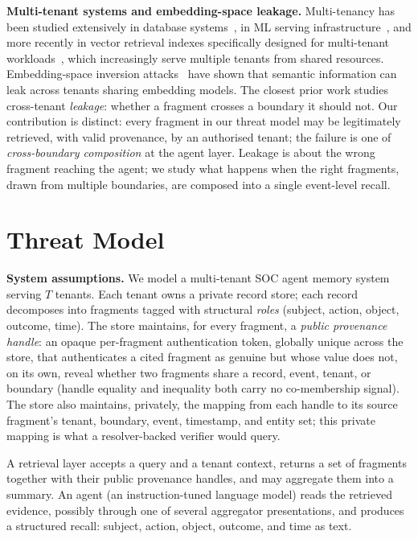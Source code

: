 \documentclass[conference,compsoc]{IEEEtran}
\begin{document}
\textbf{Multi-tenant systems and embedding-space leakage.}
Multi-tenancy has been studied extensively in database systems~\cite{aulbach2008multitenant}, in ML serving infrastructure~\cite{crankshaw2017clipper}, and more recently in vector retrieval indexes specifically designed for multi-tenant workloads~\cite{jin2024curator}, which increasingly serve multiple tenants from shared resources. Embedding-space inversion attacks~\cite{song2020embeddingleakage} have shown that semantic information can leak across tenants sharing embedding models. The closest prior work studies cross-tenant \emph{leakage}: whether a fragment crosses a boundary it should not. Our contribution is distinct: every fragment in our threat model may be legitimately retrieved, with valid provenance, by an authorised tenant; the failure is one of \emph{cross-boundary composition} at the agent layer. Leakage is about the wrong fragment reaching the agent; we study what happens when the right fragments, drawn from multiple boundaries, are composed into a single event-level recall.

\section{Threat Model}\label{sec:threat}

\textbf{System assumptions.}
We model a multi-tenant SOC agent memory system serving $T$ tenants. Each tenant owns a private record store; each record decomposes into fragments tagged with structural \emph{roles} (subject, action, object, outcome, time). The store maintains, for every fragment, a \emph{public provenance handle}: an opaque per-fragment authentication token, globally unique across the store, that authenticates a cited fragment as genuine but whose value does not, on its own, reveal whether two fragments share a record, event, tenant, or boundary (handle equality and inequality both carry no co-membership signal). The store also maintains, privately, the mapping from each handle to its source fragment's tenant, boundary, event, timestamp, and entity set; this private mapping is what a resolver-backed verifier would query.

A retrieval layer accepts a query and a tenant context, returns a set of fragments together with their public provenance handles, and may aggregate them into a summary. An agent (an instruction-tuned language model) reads the retrieved evidence, possibly through one of several aggregator presentations, and produces a structured recall: subject, action, object, outcome, and time as text.
\end{document}
